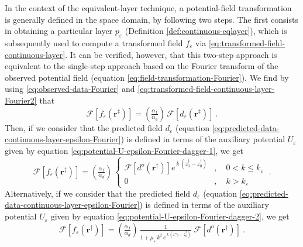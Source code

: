 In the context of the equivalent-layer technique, a potential-field transformation is generally defined
in the space domain, by following two steps. The first consists in obtaining a particular layer $p_{\varepsilon}$ 
(Definition \ref{def:continuous-eqlayer}), which is subsequently used to compute a transformed field $f_{\varepsilon}$ via 
\ref{eq:transformed-field-continuous-layer}.
It can be verified, however, that this two-step approach is equivalent to the single-step approach based on the 
Fourier transform of the observed potential field (equation \ref{eq:field-transformation-Fourier}). 
We find by using \ref{eq:observed-data-Fourier} and \ref{eq:transformed-field-continuous-layer-Fourier2} that
\begin{equation}
	\mathcal{F} [ f_{\varepsilon}(\mathbf{r}^{\ddagger}) ] =
	\left( \tfrac{\alpha_{f}}{\alpha_{d}} \right) \, \mathcal{F} [ d_{\varepsilon}(\mathbf{r}^{\ddagger}) ]
	 \: .
	\label{eq:transformed-field-continuous-layer-single-step}
\end{equation}
Then, if we consider that the predicted field $d_{\varepsilon}$ (equation \ref{eq:predicted-data-continuous-layer-epsilon-Fourier})
is defined in terms of the auxiliary potential $U_{\varepsilon}$ given by equation \ref{eq:potential-U-epsilon-Fourier-dagger-1},
we get
\begin{equation}
	\mathcal{F} [ f_{\varepsilon}(\mathbf{r}^{\ddagger}) ] =
	\left( \tfrac{\alpha_{f}}{\alpha_{d}} \right) \, 
	\begin{cases}
		\mathcal{F} \left[ d^{o}(\mathbf{r}^{\dagger}) \right] 
		e^{\, k \, (z^{\ddagger}_{0} - z^{\dagger}_{0})} & , \quad 0 < k \le k_{\varepsilon} \\
		0 & , \quad k > k_{\varepsilon} 
	\end{cases} \: .
	\label{eq:transformed-field-continuous-layer-1-single-step}
\end{equation}
Alternatively, if we consider that the predicted field $d_{\varepsilon}$ (equation \ref{eq:predicted-data-continuous-layer-epsilon-Fourier})
is defined in terms of the auxiliary potential $U_{\varepsilon}$ given by equation \ref{eq:potential-U-epsilon-Fourier-dagger-2},
we get
\begin{equation}
	\mathcal{F} [ f_{\varepsilon}(\mathbf{r}^{\ddagger}) ] =
	\left( \tfrac{\alpha_{f}}{\alpha_{d}} \right) \, 
	\tfrac{1}{1 + \mu_{\varepsilon} \, k^{2} \, e^{\, k \, (z''_{0} - z^{\dagger}_{0})}} \;
	\mathcal{F} \left[ d^{o}(\mathbf{r}^{\dagger}) \right] \: .
	\label{eq:transformed-field-continuous-layer-2-single-step}
\end{equation}
